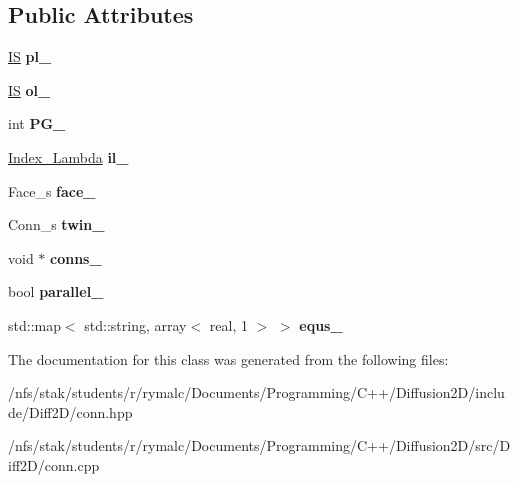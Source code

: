 \subsection*{Public Attributes}
\begin{DoxyCompactItemize}
\item 
\hypertarget{classConn_a61c9d519b93b91a14b4cc47a8cb8980b}{
\hyperlink{structIS}{IS} {\bfseries pl\_\-}}
\label{classConn_a61c9d519b93b91a14b4cc47a8cb8980b}

\item 
\hypertarget{classConn_a949773005bd6449b09e355e8f78dee47}{
\hyperlink{structIS}{IS} {\bfseries ol\_\-}}
\label{classConn_a949773005bd6449b09e355e8f78dee47}

\item 
\hypertarget{classConn_a8550bde616100c5f9cc23bc7ae267a18}{
int {\bfseries PG\_\-}}
\label{classConn_a8550bde616100c5f9cc23bc7ae267a18}

\item 
\hypertarget{classConn_a659caee9d9a125f24d7eb054ca2e5879}{
\hyperlink{structIndex__Lambda}{Index\_\-Lambda} {\bfseries il\_\-}}
\label{classConn_a659caee9d9a125f24d7eb054ca2e5879}

\item 
\hypertarget{classConn_a893abc608e559f12c5368edbd6da7b54}{
Face\_\-s {\bfseries face\_\-}}
\label{classConn_a893abc608e559f12c5368edbd6da7b54}

\item 
\hypertarget{classConn_a7578b2f58e208173f45436d7261271a0}{
Conn\_\-s {\bfseries twin\_\-}}
\label{classConn_a7578b2f58e208173f45436d7261271a0}

\item 
\hypertarget{classConn_ac571dea0fa3d37ed022872da32ad6c33}{
void $\ast$ {\bfseries conns\_\-}}
\label{classConn_ac571dea0fa3d37ed022872da32ad6c33}

\item 
\hypertarget{classConn_aae3bc6691f2e065bf44e8f1a2cd4e31f}{
bool {\bfseries parallel\_\-}}
\label{classConn_aae3bc6691f2e065bf44e8f1a2cd4e31f}

\item 
\hypertarget{classConn_a425d7d5713a82acbfa9a69adcc0c1c25}{
std::map$<$ std::string, array$<$ real, 1 $>$ $>$ {\bfseries equs\_\-}}
\label{classConn_a425d7d5713a82acbfa9a69adcc0c1c25}

\end{DoxyCompactItemize}


The documentation for this class was generated from the following files:\begin{DoxyCompactItemize}
\item 
/nfs/stak/students/r/rymalc/Documents/Programming/C++/Diffusion2D/include/Diff2D/conn.hpp\item 
/nfs/stak/students/r/rymalc/Documents/Programming/C++/Diffusion2D/src/Diff2D/conn.cpp\end{DoxyCompactItemize}
